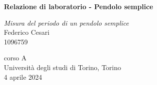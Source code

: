 \begin{titlepage}
   \begin{center}
       \vspace*{1cm}
        
       \textbf{\LARGE Relazione di laboratorio - Pendolo semplice}
       
       \vspace{0.3cm}
       \large \textit{Misura del periodo di un pendolo semplice} \\
       
       \vspace{0.5cm}
       \Large Federico Cesari \\
       
       \small 1096759

			
		
		

       \vfill
            
       
            
       \vspace{0.8cm}
     
       
            
       corso A\\
       Università degli studi di Torino, Torino\\
       4 aprile 2024\\
       
            
   \end{center}
\end{titlepage}
